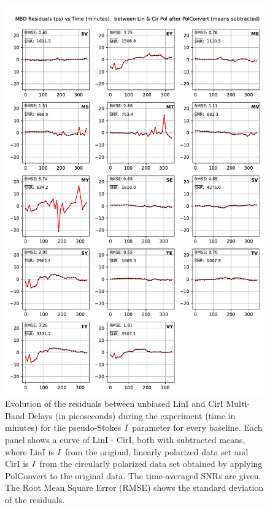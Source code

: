 \documentclass[letterpaper,twoside,12pt]{article}
\begin{document}
\begin{figure}[ht!]
  \begin{center}
  \includegraphics[width=33pc]{MBD_Lin_I_minus_Cir_I.pdf}
  \caption{\small Evolution of the residuals between unbiased LinI and CirI Multi-Band Delays (in picoseconds) during the experiment (time in minutes) for the pseudo-Stokes $\protect I$ parameter for every baseline. Each panel shows a curve of LinI - CirI, both with subtracted means, where LinI is $\protect I$ from the original, linearly polarized data set and CirI is $\protect I$ from the circularly polarized data set obtained by applying PolConvert to the original data. The time-averaged SNRs are given. The Root Mean Square Error (RMSE) shows the standard deviation of the residuals.}
  \label{mbd_lin_minus_cir}
  \end{center}
\end{figure}
\end{document}
